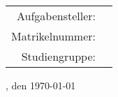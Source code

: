 ﻿%

\thispagestyle{plain}
\begin{titlepage}
	\sffamily
	 \hspace*{10ex} \vcenteredvbox{\hbox{\strut \LARGE{\textbf{\art}}}\hbox{\strut \large{\autor}}}
	\\[32ex]

	{\fontsize{50}{60}\selectfont \textbf{\titel}}\\[1.5ex]
	\LARGE{\textbf{\untertitel}}\\[25ex]

	\normalsize
	\begin{center}
		\textsc{\fakultaet}\\[1ex]
		\begin{tabular}{r l}
			Aufgabensteller:  & \quad \aufgabensteller\\[1.2ex]
			Matrikelnummer: & \quad \matrikelnr\\[1.2ex]
			Studiengruppe: & \quad \studiengruppe\\[3ex]
		\end{tabular}
	\end{center}
	\ort, den \today
\end{titlepage}